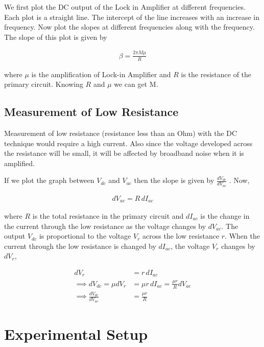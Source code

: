 We first plot the DC output of the Lock in Amplifier at different frequencies. Each plot is a straight
line. The intercept of the line increases with an increase in frequency. Now plot the slopes at different
frequencies along with the frequency. The slope of
this plot is given by

\begin{align}
    \beta = \frac{2 \pi M \mu}{R}
\end{align}

where $\mu$ is the amplification of Lock-in Amplifier and
$R$ is the resistance of the primary circuit. Knowing
$R$ and $\mu$ we can get M.

\subsection*{Measurement of Low Resistance}

Measurement of low resistance (resistance less than
an Ohm) with the DC technique would require a
high current. Also since the voltage developed across
the resistance will be small, it will be affected by
broadband noise when it is amplified.

If we plot the graph between $V_{dc}$ and $V_{ac}$ then the
slope is given by $\frac{dV_{dc}}{dV_{ac}}$ . Now,

\begin{align}
    dV_{ac} = R\,dI_{ac}
\end{align}

where $R$ is the total resistance in the primary circuit and $dI_{ac}$ is the change in the
current through the low resistance as the voltage changes by
$dV_{ac}$. The output $V_{dc}$ is proportional to the voltage $V_r$ across the low
resistance $r$. When the current through the low resistance is changed by $dI_{ac}$, the
voltage $V_r$ changes by $dV_r$,

\begin{align}
    dV_r &= r\,dI_{ac}\\
    \implies dV_{dc} = \mu dV_r &= \mu r\,dI_{ac} = \frac{\mu r}{R}dV_{ac}\\
    \implies \frac{dV_{dc}}{dV_{ac}} &= \frac{\mu r}{R}
\end{align}

\section{Experimental Setup}

